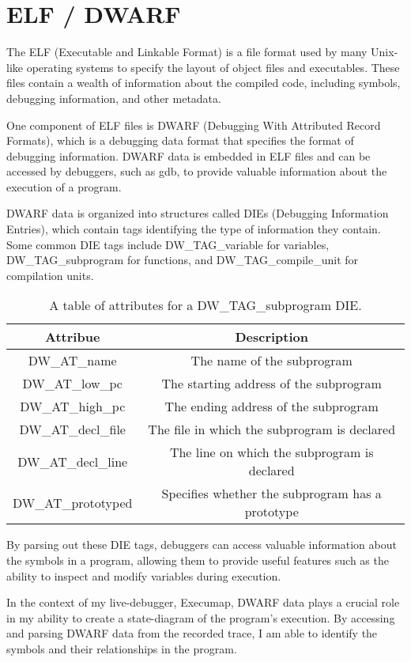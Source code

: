 \section{ELF / DWARF}
The ELF (Executable and Linkable Format) is a file format used by many Unix-like operating systems to specify the layout of object files and executables. These files contain a wealth of information about the compiled code, including symbols, debugging information, and other metadata.

One component of ELF files is DWARF (Debugging With Attributed Record Formats), which is a debugging data format that specifies the format of debugging information. DWARF data is embedded in ELF files and can be accessed by debuggers, such as gdb, to provide valuable information about the execution of a program.

DWARF data is organized into structures called DIEs (Debugging Information Entries), which contain tags identifying the type of information they contain. Some common DIE tags include DW\_TAG\_variable for variables, DW\_TAG\_subprogram for functions, and DW\_TAG\_compile\_unit for compilation units. \\

\begin{table}
\centering
\begin{tabular}{|c|c|}
\hline
\textbf{Attribue} & \textbf{Description} \\ \hline
DW\_AT\_name & The name of the subprogram \\ \hline
DW\_AT\_low\_pc & The starting address of the subprogram \\ \hline
DW\_AT\_high\_pc & The ending address of the subprogram \\ \hline
DW\_AT\_decl\_file & The file in which the subprogram is declared \\ \hline
DW\_AT\_decl\_line & The line on which the subprogram is declared \\ \hline
DW\_AT\_prototyped & Specifies whether the subprogram has a prototype \\ \hline
\end{tabular}
\caption{A table of attributes for a DW\_TAG\_subprogram DIE.}
\end{table}

By parsing out these DIE tags, debuggers can access valuable information about the symbols in a program, allowing them to provide useful features such as the ability to inspect and modify variables during execution.

In the context of my live-debugger, Execumap, DWARF data plays a crucial role in my ability to create a state-diagram of the program's execution. By accessing and parsing DWARF data from the recorded trace, I am able to identify the symbols and their relationships in the program.

